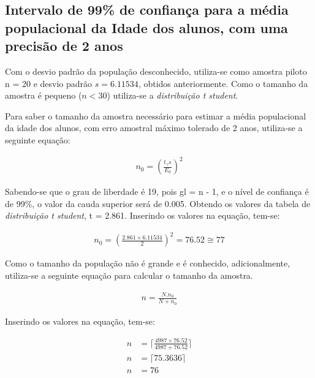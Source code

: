 \subsection{Intervalo de 99\% de confiança para a média populacional da Idade dos alunos, com uma precisão de 2 anos}

	Com o desvio padrão da população desconhecido, utiliza-se como amostra
	piloto n = 20 e desvio padrão $s = \num{6,11534}$, obtidos anteriormente. Como o
	tamanho da amostra é pequeno ($n < 30$) utiliza-se a
	\textit{distribuição t student}.

	Para saber o tamanho da amostra necessário para estimar a média
	populacional da idade dos alunos, com erro amostral máximo tolerado de 2
	anos, utiliza-se a seguinte equação:

	\begin{align*}
		 n_0 = \left (\frac{t_\gamma s}{E_0} \right)^2
	\end{align*}

	Sabendo-se que o grau de liberdade é 19, pois gl = n - 1, e o nível de
	confiança é de 99\%, o valor da cauda superior será de \num{0,005}. Obtendo os
	valores da tabela de \textit{distribuição t student}, t = \num{2,861}.
	Inserindo os valores na equação, tem-se:

	\begin{align*}
		n_0 = \left (\frac{\num{2,861} \times \num{6,11534}}{2} \right)^2 = \num{76,52} \cong 77
	\end{align*}

	Como o tamanho da população não é grande e é conhecido, adicionalmente,
	utiliza-se a seguinte equação para calcular o tamanho da amostra.

	\begin{align*}
		n = \frac{N . n_0}{N + n_0}
	\end{align*}

	Inserindo os valores na equação, tem-se:

	\begin{align*}
		n &= \Big\lceil \frac{4987 \times \num{76,52}}{4987 + \num{76,52}} \Big\rceil \\
		n &= \lceil \num{75,3636} \rceil \\
		n &= 76
	\end{align*}

